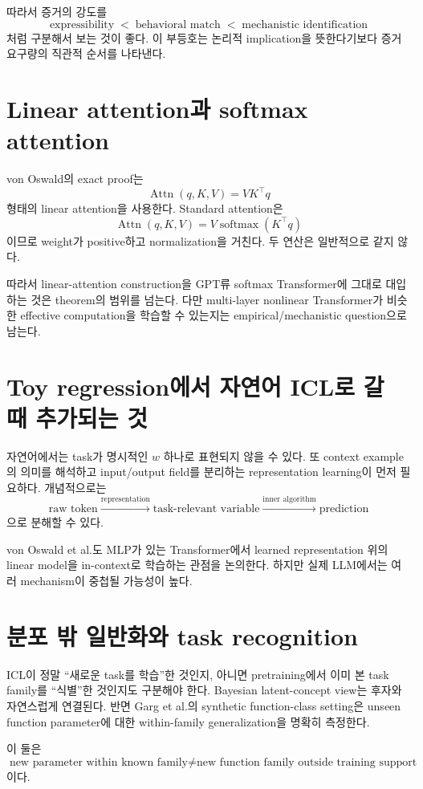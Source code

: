 \documentclass[11pt,a4paper,oneside,openany]{memoir}
\newcommand{\softmax}{\operatorname{softmax}}
\newcommand{\Attn}{\operatorname{Attn}}
\theoremstyle{definition}
\begin{document}
따라서 증거의 강도를
\[
\boxed{
\text{expressibility}
\;<\;
\text{behavioral match}
\;<\;
\text{mechanistic identification}
}
\]
처럼 구분해서 보는 것이 좋다. 이 부등호는 논리적 implication을 뜻한다기보다 증거 요구량의 직관적 순서를 나타낸다.

\section{Linear attention과 softmax attention}

von Oswald의 exact proof는
\[
\Attn(q,K,V)=VK^\top q
\]
형태의 linear attention을 사용한다.
Standard attention은
\[
\Attn(q,K,V)
=V\softmax(K^\top q)
\]
이므로 weight가 positive하고 normalization을 거친다.
두 연산은 일반적으로 같지 않다.

따라서 linear-attention construction을 GPT류 softmax Transformer에 그대로 대입하는 것은 theorem의 범위를 넘는다.
다만 multi-layer nonlinear Transformer가 비슷한 effective computation을 학습할 수 있는지는 empirical/mechanistic question으로 남는다.

\section{Toy regression에서 자연어 ICL로 갈 때 추가되는 것}

자연어에서는 task가 명시적인 $w$ 하나로 표현되지 않을 수 있다.
또 context example의 의미를 해석하고 input/output field를 분리하는 representation learning이 먼저 필요하다.
개념적으로는
\[
\text{raw token}
\xrightarrow{\text{representation}}
\text{task-relevant variable}
\xrightarrow{\text{inner algorithm}}
\text{prediction}
\]
으로 분해할 수 있다.

von Oswald et al.도 MLP가 있는 Transformer에서 learned representation 위의 linear model을 in-context로 학습하는 관점을 논의한다.
하지만 실제 LLM에서는 여러 mechanism이 중첩될 가능성이 높다.

\section{분포 밖 일반화와 task recognition}

ICL이 정말 ``새로운 task를 학습''한 것인지, 아니면 pretraining에서 이미 본 task family를 ``식별''한 것인지도 구분해야 한다.
Bayesian latent-concept view는 후자와 자연스럽게 연결된다.
반면 Garg et al.의 synthetic function-class setting은 unseen function parameter에 대한 within-family generalization을 명확히 측정한다.

이 둘은
\[
\text{new parameter within known family}
\neq
\text{new function family outside training support}
\]
이다.
\end{document}
